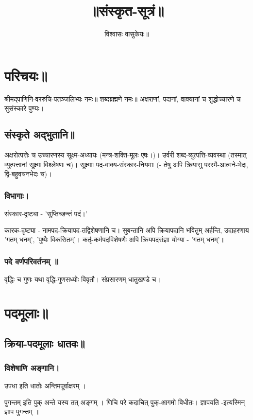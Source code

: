 \documentclass[oneside, article]{memoir}
\title{॥संस्कृत-सूत्रं॥}
\author{विश्वासः वासुकेयः॥}
\begin{document}
\maketitle

\part{परिचयः॥}
श्रीमद्पाणिनि-वररुचि-पतञ्जलिभ्यः नमः॥ शब्दब्रह्मणे नमः॥ अक्षराणां, पदानां, वाक्यानां च शुद्धोच्चारणे च सुसंस्कारे पुण्यः।

\chapter{संस्कृते अद्भुतानि॥}
अक्षरोत्पत्तेः च उच्चारणस्य सूक्ष्म-अध्यायः (मन्त्र-शक्ति-मूलः एषः।)। उर्वरी शब्द-व्युत्पत्ति-व्यवस्था (तस्मात् व्युत्पत्तानां सूक्ष्मः विश्लेषणः च)। सूक्ष्माः पद-वाक्य-संस्कार-नियमाः (- तेषु अपि क्रियासु परस्मै-आत्मने-भेदः, द्वि-बहुवचनभेदः च)।

\section{विभागाः।}
संस्कार-दृष्ट्या - 'सुप्तिच्ङन्तं पदं।'

कारक-दृष्ट्या - नामपद-क्रियापद-तद्विशेषणानि च। सुबन्तानि अपि क्रियापदानि भवितुम् अर्हन्ति, उदाहरणाय 'गतम् धनम्', 'पुष्पैः विकसितम्'। कर्तृ-कर्मपदविशेषणैः अपि क्रियपदसंज्ञा योग्या  - 'गतम् धनम्'।

\section{पदे वर्णपरिवर्तनम् ॥}
वृद्धिः च गुणः यथा वृद्धि-गुणसध्योः विवृतौ। संप्रसारणम् धातुखण्डे च।

\part{पदमूलाः॥}
\chapter{क्रिया-पदमूलाः धातवः॥}
\section{विशेषाणि अङ्गानि।}
उपधा इति धातोः अन्तिमपूर्वाक्षरम् ।

पुगन्तम् इति पुक् अन्ते यस्य तत् अङ्गम् । णिचि परे कदाचित् पुक्-आगमो विधीतः। ज्ञापयति -इत्यस्मिन् ज्ञाप पुगन्तम् ।
\end{document}

